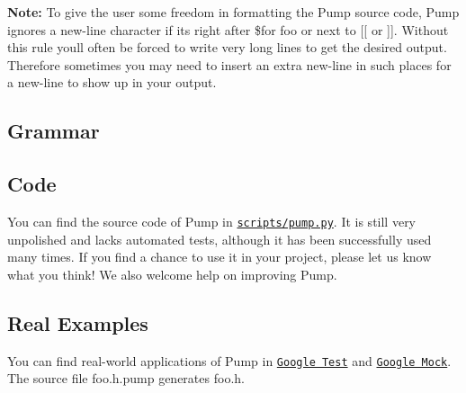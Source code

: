 {\bfseries Note\+:} To give the user some freedom in formatting the Pump source code, Pump ignores a new-\/line character if it\textquotesingle{}s right after {\ttfamily \$for foo} or next to {\ttfamily \mbox{[}\mbox{[}} or {\ttfamily \mbox{]}\mbox{]}}. Without this rule you\textquotesingle{}ll often be forced to write very long lines to get the desired output. Therefore sometimes you may need to insert an extra new-\/line in such places for a new-\/line to show up in your output.

\subsection*{Grammar}


\begin{DoxyCode}{0}
\DoxyCodeLine{    | \$(\$)}
\DoxyCodeLine{    | [[ code ]]}
\end{DoxyCode}


\subsection*{Code}

You can find the source code of Pump in \href{../scripts/pump.py}{\tt scripts/pump.\+py}. It is still very unpolished and lacks automated tests, although it has been successfully used many times. If you find a chance to use it in your project, please let us know what you think! We also welcome help on improving Pump.

\subsection*{Real Examples}

You can find real-\/world applications of Pump in \href{https://github.com/google/googletest/tree/master/googletest}{\tt Google Test} and \href{https://github.com/google/googletest/tree/master/googlemock}{\tt Google Mock}. The source file {\ttfamily foo.\+h.\+pump} generates {\ttfamily foo.\+h}.

